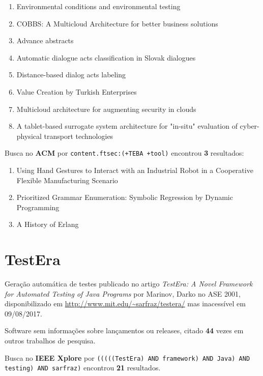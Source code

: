 \begin{enumerate}
\item Environmental conditions and environmental testing
\item COBBS: A Multicloud Architecture for better business solutions
\item Advance abstracts
\item Automatic dialogue acts classification in Slovak dialogues
\item Distance-based dialog acts labeling
\item Value Creation by Turkish Enterprises
\item Multicloud architecture for augmenting security in clouds
\item A tablet-based surrogate system architecture for "in-situ" evaluation of cyber-physical transport technologies
\end{enumerate}

Busca no {\bf ACM} por
\texttt{content.ftsec:(+TEBA +tool)}
encontrou {\bf 3}
resultados:

\begin{enumerate}
\item Using Hand Gestures to Interact with an Industrial Robot in a Cooperative Flexible Manufacturing Scenario
\item Prioritized Grammar Enumeration: Symbolic Regression by Dynamic Programming
\item A History of Erlang
\end{enumerate}

\section{TestEra}

Geração automática de testes
publicado no artigo {\it TestEra: A Novel Framework for Automated Testing of Java Programs}
por Marinov, Darko
no ASE 2001,
disponibilizado em \url{http://www.mit.edu/~sarfraz/testera/}
mas inacessível em 09/08/2017.

Software sem informações sobre lançamentos ou releases,
citado {\bf 44} vezes em outros trabalhos de pesquisa.

Busca no {\bf IEEE Xplore} por
\texttt{(((((TestEra) AND framework) AND Java) AND testing) AND sarfraz)}
encontrou {\bf 21}
resultados.

